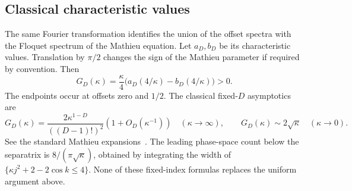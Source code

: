 \subsection{Classical characteristic values}
The same Fourier transformation identifies the union of the offset spectra with the Floquet spectrum of the Mathieu equation. Let $a_D,b_D$ be its characteristic values. Translation by $\pi/2$ changes the sign of the Mathieu parameter if required by convention. Then
\begin{equation}\label{eq:Mathieugap}
 G_D(\kappa)=\frac\kappa4
       \bigl(a_D(4/\kappa)-b_D(4/\kappa)\bigr)>0.
\end{equation}
The endpoints occur at offsets zero and $1/2$. The classical fixed-$D$ asymptotics are
\[
 G_D(\kappa)=\frac{2\kappa^{1-D}}{((D-1)!)^2}
                (1+O_D(\kappa^{-1}))\quad(\kappa\to\infty),
 \qquad G_D(\kappa)\sim2\sqrt\kappa\quad(\kappa\to0).
\]
See the standard Mathieu expansions~\cite{DLMF}. The leading phase-space count below the separatrix is $8/(\pi\sqrt\kappa)$, obtained by integrating the width of $\{\kappa j^2+2-2\cos k\le4\}$. None of these fixed-index formulas replaces the uniform argument above.

\label{end:mathieu}
